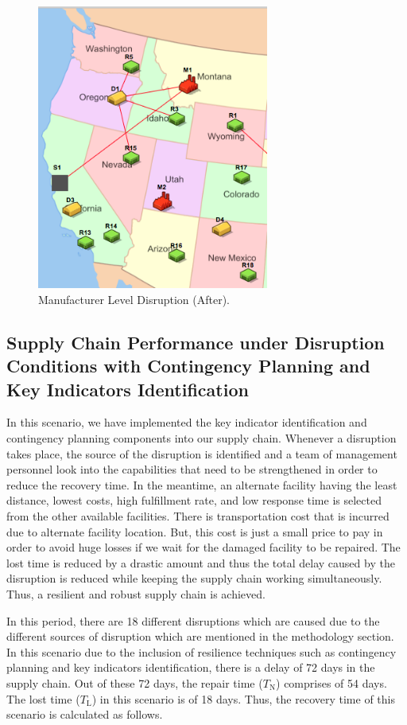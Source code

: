 \begin{figure}[H]
    \centering
   \includegraphics[width=3.0in]{figures/pdf/AfterM.png}
   \caption{Manufacturer Level Disruption (After).}
   \label{fig:MLDa}
\end{figure}

\subsection{Supply Chain Performance under Disruption Conditions with Contingency Planning and Key Indicators Identification}
In this scenario, we have implemented the key indicator identification and contingency planning components into our supply chain. Whenever a disruption takes place, the source of the disruption is identified and a team of management personnel look into the capabilities that need to be strengthened in order to reduce the recovery time. In the meantime, an alternate facility having the least distance, lowest costs, high fulfillment rate, and low response time is selected from the other available facilities. There is transportation cost that is incurred due to alternate facility location. But, this cost is just a small price to pay in order to avoid huge losses if we wait for the damaged facility to be repaired. The lost time is reduced by a drastic amount and thus the total delay caused by the disruption is reduced while keeping the supply chain working simultaneously. Thus, a resilient and robust supply chain is achieved.

In this period, there are 18 different disruptions which are caused due to the different sources of disruption which are mentioned in the methodology section. In this scenario due to the inclusion of resilience techniques such as contingency planning and key indicators identification, there is a delay of 72 days in the supply chain. Out of these 72 days, the repair time ($T_{\text{N}}$) comprises of 54 days. The lost time ($T_{\text{L}}$) in this scenario is of 18 days. Thus, the recovery time of this scenario is calculated as follows.

